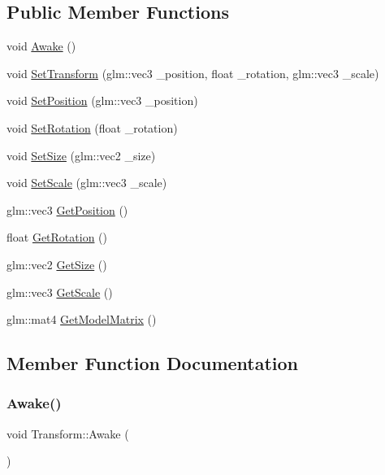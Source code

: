 \subsection*{Public Member Functions}
\begin{DoxyCompactItemize}
\item 
void \mbox{\hyperlink{class_transform_a82b79cb6c3af6ff717051144194d7e28}{Awake}} ()
\item 
void \mbox{\hyperlink{class_transform_af6c69e65b609a3d9e6028b4ffc7baada}{Set\+Transform}} (glm\+::vec3 \+\_\+position, float \+\_\+rotation, glm\+::vec3 \+\_\+scale)
\item 
void \mbox{\hyperlink{class_transform_ae6273120a938b99bbec52900770e6935}{Set\+Position}} (glm\+::vec3 \+\_\+position)
\item 
void \mbox{\hyperlink{class_transform_afee469d2dba032aab48471a0a0a42c5c}{Set\+Rotation}} (float \+\_\+rotation)
\item 
void \mbox{\hyperlink{class_transform_a8fb9524f56de0f31984d526156eec5cb}{Set\+Size}} (glm\+::vec2 \+\_\+size)
\item 
void \mbox{\hyperlink{class_transform_af741bc745e441e4c3175f9aff07c5d98}{Set\+Scale}} (glm\+::vec3 \+\_\+scale)
\item 
glm\+::vec3 \mbox{\hyperlink{class_transform_ab56d0806d3d2d67a0587c7ffebf0b2d0}{Get\+Position}} ()
\item 
float \mbox{\hyperlink{class_transform_aae910229b0e924b7bd2b7ead1a5ac1d3}{Get\+Rotation}} ()
\item 
glm\+::vec2 \mbox{\hyperlink{class_transform_a9042f2b38daaaf48b807b648e9adccbd}{Get\+Size}} ()
\item 
glm\+::vec3 \mbox{\hyperlink{class_transform_a28a37980813cba4e8bada11d5ee6d070}{Get\+Scale}} ()
\item 
glm\+::mat4 \mbox{\hyperlink{class_transform_aac5b8a016ec8ecb9eae51e636322a7dd}{Get\+Model\+Matrix}} ()
\end{DoxyCompactItemize}


\subsection{Member Function Documentation}
\mbox{\label{class_transform_a82b79cb6c3af6ff717051144194d7e28}} 
\subsubsection{\texorpdfstring{Awake()}{Awake()}}
{\footnotesize\ttfamily void Transform\+::\+Awake (\begin{DoxyParamCaption}{ }\end{DoxyParamCaption})\hspace{0.3cm}{\ttfamily [virtual]}}



